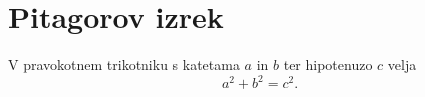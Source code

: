 \documentclass{article}
\begin{document}
\section*{Pitagorov izrek}
V pravokotnem trikotniku s katetama \(a\) in \(b\) ter hipotenuzo \(c\) velja
\[ 
a^2 + b^2 = c^2.
\]
\end{document}
